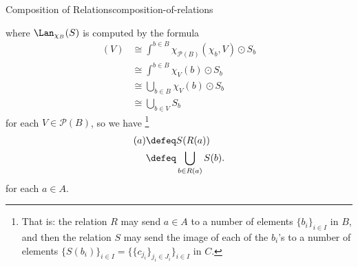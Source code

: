 \begin{definition}{Composition of Relations}{composition-of-relations}
\begin{itemize}
\begin{webcompile}
%
            \end{webcompile}
            where $\Lan_{\chi_{B}}(S)$ is computed by the formula
            \begin{align*}
                [\Lan_{\chi_{B}}(S)](V) &\cong \int^{b\in B}\chi_{\mathcal{P}(B)}(\chi_{b},V)\odot S_{b}\\
                                        &\cong \int^{b\in B}\chi_{V}(b)\odot S_{b}\\%
                                        &\cong \bigcup_{b\in B}\chi_{V}(b)\odot S_{b}\\
                                        &\cong \bigcup_{b\in V}S_{b}
            \end{align*}
            for each $V\in\mathcal{P}(B)$, so we have%
            \footnote{%
                That is: the relation $R$ may send $a\in A$ to a number of elements $\{b_{i}\}_{i\in I}$ in $B$, and then the relation $S$ may send the image of each of the $b_{i}$'s to a number of elements $\{S(b_{i})\}_{i\in I}=\{\{c_{j_{i}}\}_{j_{i}\in J_{i}}\}_{i\in I}$ in $C$.
                \par\vspace*{\TCBBoxCorrection}
            }%
            \begin{align*}
                [S\procirc R](a) &\defeq S(R(a))\\
                                 &\defeq \bigcup_{b\in R(a)}S(b).
            \end{align*}
            for each $a\in A$.
    \end{itemize}
\end{definition}
